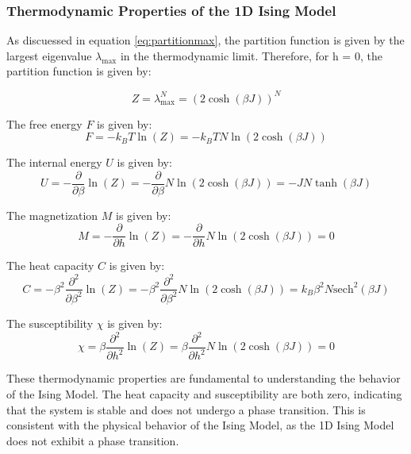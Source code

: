 \subsubsection{Thermodynamic Properties of the 1D Ising Model}

As discuessed in equation \ref{eq:partitionmax}, the partition function is given
by the largest eigenvalue \( \lambda_{\text{max}} \) in the thermodynamic limit.
Therefore, for h = 0, the partition function is given by:

\begin{equation}
Z = \lambda_{\text{max}}^N = (2 \cosh(\beta J))^N
\label{eq:partitionh0}
\end{equation}

The free energy \( F \) is given by:
\begin{equation}
F = -k_B T \ln(Z) = -k_B T N \ln(2 \cosh(\beta J))
\end{equation}

The internal energy \( U \) is given by:
\begin{equation}
U = - \frac{\partial}{\partial \beta} \ln(Z) = - \frac{\partial}{\partial \beta} N \ln(2 \cosh(\beta J)) = -JN \tanh(\beta J)
\end{equation}

The magnetization \( M \) is given by:
\begin{equation}
M = - \frac{\partial}{\partial h} \ln(Z) = - \frac{\partial}{\partial h} N \ln(2 \cosh(\beta J)) = 0
\end{equation}

The heat capacity \( C \) is given by:
\begin{equation}
C = - \beta^2 \frac{\partial^2}{\partial \beta^2} \ln(Z) = - \beta^2 \frac{\partial^2}{\partial \beta^2} N \ln(2 \cosh(\beta J)) = k_B \beta^2 N \text{sech}^2(\beta J)
\end{equation}

The susceptibility \( \chi \) is given by:
\begin{equation}
\chi = \beta \frac{\partial^2}{\partial h^2} \ln(Z) = \beta \frac{\partial^2}{\partial h^2} N \ln(2 \cosh(\beta J)) = 0
\end{equation}

These thermodynamic properties are fundamental to understanding the behavior of
the Ising Model. The heat capacity and susceptibility are both zero, indicating
that the system is stable and does not undergo a phase transition. This is
consistent with the physical behavior of the Ising Model, as the 1D Ising Model
does not exhibit a phase transition.

